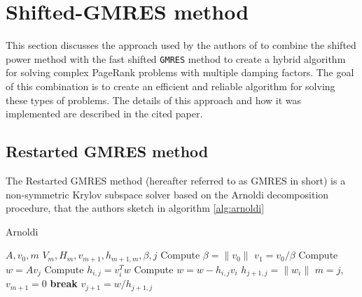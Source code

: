 \clearpage
\section{Shifted-GMRES method}

This section discusses the approach used by the authors of \cite{SHEN2022126799} to combine the shifted power method with the fast shifted \texttt{GMRES} method to create a hybrid algorithm for solving complex PageRank problems with multiple damping factors. The goal of this combination is to create an efficient and reliable algorithm for solving these types of problems. The details of this approach and how it was implemented are described in the cited paper.

\subsection{Restarted GMRES method}

The Restarted GMRES method (hereafter referred to as GMRES in short) is a non-symmetric Krylov subspace solver based on the Arnoldi decomposition procedure, that the authors sketch in algorithm \ref{alg:arnoldi}

\begin{algorithm}[H]
\caption{Arnoldi}
\label{alg:arnoldi}
\begin{algorithmic}[1]
    \Require $A, v_0, m$
    \Ensure $V_m, H_m, v_{m+1}, h_{m+1,m}, \beta, j$
    \State Compute $\beta = \lVert v_0 \rVert$
    \State $v_1 = v_0/ \beta$
        \State Compute $w = Av_j$
            \State Compute $h_{i,j} = v_i^T w$
            \State Compute $w = w - h_{i,j} v_i$
        \EndFor
        \State $h_{j+1,j} = \lVert w_i \rVert$
            \State $m = j$, 
            \State $v_{m+1} = 0$
            \State \textbf{break}
        \Else
            \State $v_{j+1} = w / h_{j+1,j}$
        \EndIf
    \EndFor
\end{algorithmic}
\end{algorithm}

